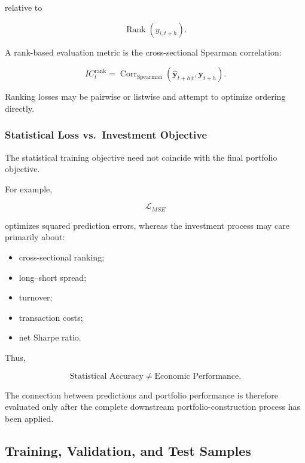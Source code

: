 \documentclass[11pt,a4paper]{article}
\begin{document}
relative to

\begin{equation}
\operatorname{Rank}
\left(
y_{i,t+h}
\right).
\end{equation}

A rank-based evaluation metric is the cross-sectional Spearman correlation:

\begin{equation}
\boxed{
IC_t^{\mathrm{rank}}
=
\operatorname{Corr}_{\mathrm{Spearman}}
\left(
\widehat{\mathbf{y}}_{t+h|t},
\mathbf{y}_{t+h}
\right).
}
\end{equation}

Ranking losses may be pairwise or listwise and attempt to optimize ordering
directly.


\subsubsection{Statistical Loss vs.\ Investment Objective}

The statistical training objective need not coincide with the final portfolio
objective.

For example,

\begin{equation}
\mathcal{L}_{MSE}
\end{equation}

optimizes squared prediction errors, whereas the investment process may care
primarily about:

\begin{itemize}
    \item cross-sectional ranking;
    \item long--short spread;
    \item turnover;
    \item transaction costs;
    \item net Sharpe ratio.
\end{itemize}

Thus,

\begin{equation}
\boxed{
\text{Statistical Accuracy}
\neq
\text{Economic Performance}.
}
\end{equation}

The connection between predictions and portfolio performance is therefore
evaluated only after the complete downstream portfolio-construction process has
been applied.


\subsection{Training, Validation, and Test Samples}
\label{subsec:train_validation_test}
\end{document}
